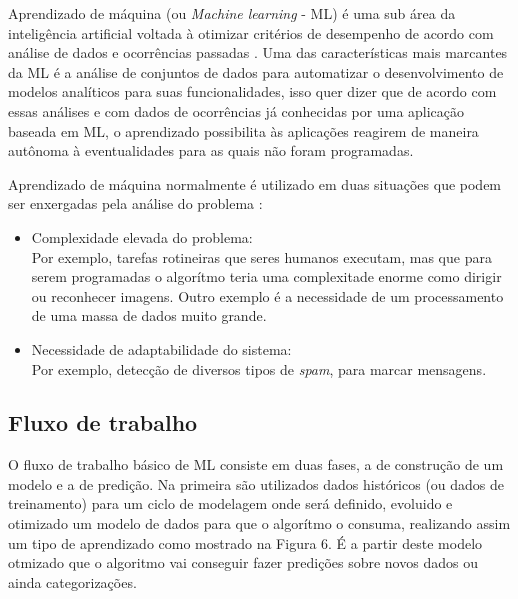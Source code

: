Aprendizado de máquina (ou \textit{Machine learning} - ML) é uma sub área da inteligência artificial voltada à otimizar critérios de desempenho de acordo com análise de dados e ocorrências passadas \cite{alpaydin2010}. Uma das características mais marcantes da ML é a análise de conjuntos de dados para automatizar o desenvolvimento de modelos analíticos para suas funcionalidades, isso quer dizer que de acordo com essas análises e com dados de ocorrências já conhecidas por uma aplicação baseada em ML, o aprendizado possibilita às aplicações reagirem de maneira autônoma à eventualidades para as quais não foram programadas.

Aprendizado de máquina normalmente é utilizado em duas situações que podem ser enxergadas pela análise do problema \cite{shalev2014}:

\begin{itemize}
    \item Complexidade elevada do problema: \\ Por exemplo, tarefas rotineiras que seres humanos executam, mas que para serem programadas o algorítmo teria uma complexitade enorme como dirigir ou reconhecer imagens. Outro exemplo é a necessidade de um processamento de uma massa de dados muito grande.
    \item Necessidade de adaptabilidade do sistema: \\ Por exemplo, detecção de diversos tipos de \textit{spam}, para marcar mensagens. \\
\end{itemize}

\subsection{Fluxo de trabalho}
    O fluxo de trabalho básico de ML consiste em duas fases, a de construção de um modelo e a de predição. Na primeira são utilizados dados históricos (ou dados de treinamento) para um ciclo de modelagem onde será definido, evoluido e otimizado um modelo de dados para que o algorítmo o consuma, realizando assim um tipo de aprendizado como mostrado na Figura 6. É a partir deste modelo otmizado que o algoritmo vai conseguir fazer predições sobre novos dados ou ainda categorizações.

